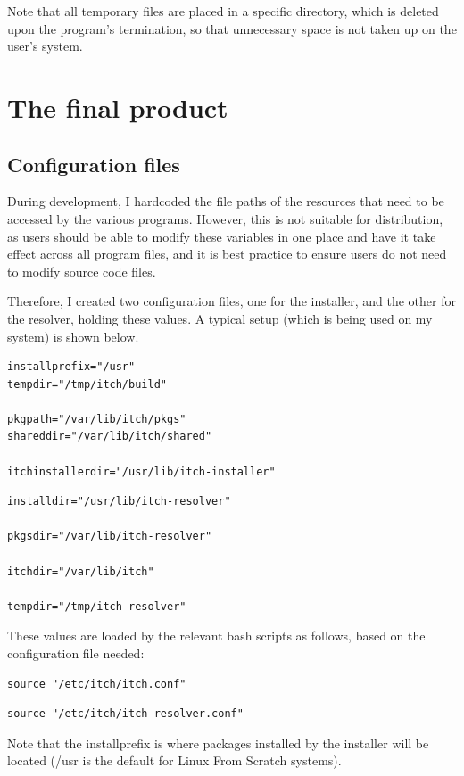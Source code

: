 \documentclass[10pt]{article}
\begin{document}
Note that all temporary files are placed in a specific directory, which is deleted upon the program's termination, so that unnecessary space is not taken up on the user's system.

\section{The final product}

\subsection{Configuration files} \label{ConfigFileSS}

During development, I hardcoded the file paths of the resources that need to be accessed by the various programs. However, this is not suitable for distribution, as users should be able to modify these variables in one place and have it take effect across all program files, and it is best practice to ensure users do not need to modify source code files.

Therefore, I created two configuration files, one for the installer, and the other for the resolver, holding these values. A typical setup (which is being used on my system) is shown below.

\begin{lstlisting}
installprefix="/usr"
tempdir="/tmp/itch/build"

pkgpath="/var/lib/itch/pkgs"
shareddir="/var/lib/itch/shared"

itchinstallerdir="/usr/lib/itch-installer"
\end{lstlisting}

\begin{lstlisting}
installdir="/usr/lib/itch-resolver"

pkgsdir="/var/lib/itch-resolver"

itchdir="/var/lib/itch"

tempdir="/tmp/itch-resolver"
\end{lstlisting}

These values are loaded by the relevant bash scripts as follows, based on the configuration file needed:
\begin{lstlisting}
source "/etc/itch/itch.conf"
\end{lstlisting}
\begin{lstlisting}
source "/etc/itch/itch-resolver.conf"
\end{lstlisting}

Note that the installprefix is where packages installed by the installer will be located (/usr is the default for Linux From Scratch systems).
\end{document}
